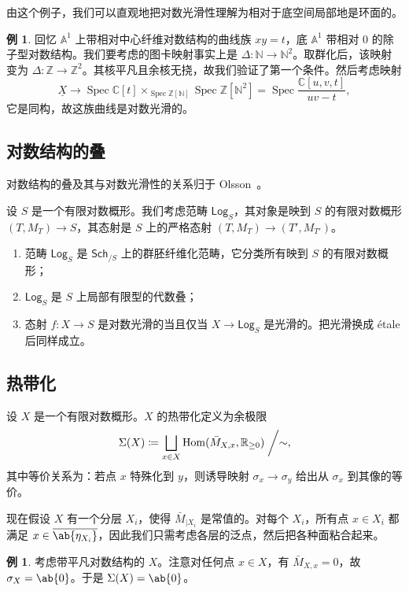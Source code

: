 \documentclass{amsart}
\theoremstyle{definition}
\newtheorem{exm}[thm]{例}
\theoremstyle{remark}
\theoremstyle{plain}
\theoremstyle{definition}
\theoremstyle{remark}
\newcommand{\A}{\mathbb{A}}
\newcommand{\N}{\mathbb{N}}
\newcommand{\R}{\mathbb{R}}
\newcommand{\C}{\mathbb{C}}
\newcommand{\Z}{\mathbb{Z}}
\newcommand{\ms}[1]{\mathsf{#1}}
\newcommand{\ol}[1]{\overline{#1}}
\newcommand{\ul}[1]{\underline{#1}}
\newcommand{\1}{\mathbf{1}}
\newcommand{\2}{\mathbf{2}}
\newcommand{\3}{\mathbf{3}}
\DeclareMathOperator{\Hom}{Hom}
\DeclareMathOperator{\Spec}{Spec}
\begin{document}
由这个例子，我们可以直观地把对数光滑性理解为相对于底空间局部地是环面的。

\begin{exm}
    回忆 \(\A^1\) 上带相对中心纤维对数结构的曲线族 \(xy = t\)，底 \(\A^1\) 带相对 \(0\) 的除子型对数结构。我们要考虑的图卡映射事实上是 \(\Delta \colon \N \to \N^2\)。取群化后，该映射变为 \(\Delta \colon \Z \to \Z^2\)。其核平凡且余核无挠，故我们验证了第一个条件。然后考虑映射
    \[ \ul{X} \to \Spec \C[t] \times_{\Spec \Z[\N]} \Spec \Z[\N^2] = \Spec \frac{\C[u,v,t]}{uv-t}, \]
    它是同构，故这族曲线是对数光滑的。
\end{exm}

\subsection{对数结构的叠}%
\label{sub:Stack of log structures}

对数结构的叠及其与对数光滑性的关系归于 Olsson~\cite{Olsson2003}。

设 \(S\) 是一个有限对数概形。我们考虑范畴 \(\ms{Log}_S\)，其对象是映到 \(S\) 的有限对数概形 \((T, M_T) \to S\)，其态射是 \(S\) 上的严格态射 \((T, M_T) \to (T', M_{T'})\)。
\begin{enumerate}
    \item 范畴 \(\ms{Log}_S\) 是 \(\ms{Sch}_{/S}\) 上的群胚纤维化范畴，它分类所有映到 \(S\) 的有限对数概形；
    \item \(\ms{Log}_S\) 是 \(S\) 上局部有限型的代数叠；
    \item 态射 \(f \colon X \to S\) 是对数光滑的当且仅当 \(X \to \ms{Log}_S\) 是光滑的。把光滑换成 \'etale 后同样成立。
\end{enumerate}

\subsection{热带化}%
\label{sub:Tropicalization}

设 \(X\) 是一个有限对数概形。\(X\) 的热带化定义为余极限
\[\Sigma(X) \coloneqq \bigsqcup_{x \in X} \Hom(\bar{M}_{X,x}, \R_{\geq 0}) \biggm/ \sim, \]
其中等价关系为：若点 \(x\) 特殊化到 \(y\)，则诱导映射 \(\sigma_x \to \sigma_y\) 给出从 \(\sigma_x\) 到其像的等价。

现在假设 \(X\) 有一个分层 \(X_i\)，使得 \(\bar{M}_{|X_i}\) 是常值的。对每个 \(X_i\)，所有点 \(x \in X_i\) 都满足 \(x \in \ol{\ab\{\eta_{X_i}\}}\)，因此我们只需考虑各层的泛点，然后把各种面粘合起来。

\begin{exm}
    考虑带平凡对数结构的 \(X\)。注意对任何点 \(x \in X\)，有 \(\bar{M}_{X,x} = 0\)，故 \(\sigma_X = \ab\{0\}\)。于是 \(\Sigma(X) = \ab\{0\}\)。
\end{exm}
\end{document}
